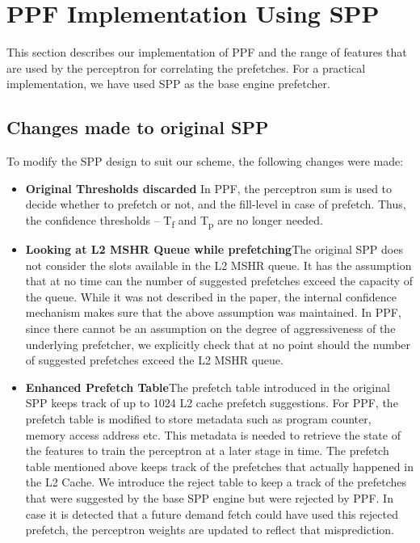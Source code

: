 \section{PPF Implementation Using SPP}
\label{Impl}

This section describes our implementation of PPF and the range of 
features that are used by the perceptron for correlating 
the prefetches.  For a practical implementation, we have used SPP 
as the base engine prefetcher.

\subsection{Changes made to original SPP}
\label{Impl-Changes}
To modify the SPP design to suit our scheme, the following changes were made:

\begin{itemize}
\item \textbf{Original Thresholds discarded}\newline 
  In PPF, the perceptron sum is used to decide whether to prefetch or not, 
  and the fill-level in case of prefetch. 
  Thus, the confidence thresholds --  T\textsubscript{f} and T\textsubscript{p} 
  are no longer needed.


\item \textbf{Looking at L2 MSHR Queue while prefetching}\newline The original
  SPP does not consider the slots available in the L2 MSHR queue.  It has the
  assumption that at no time can the number of suggested prefetches
  exceed the capacity of the queue.  While it was not described in the paper, the
  internal confidence mechanism makes sure that the above assumption was maintained.  
  In PPF, since there cannot be an assumption on the degree of aggressiveness of the 
  underlying prefetcher, we explicitly check that at no point should the number 
  of suggested prefetches exceed the L2 MSHR queue.

\item \textbf{Enhanced Prefetch Table}\newline The prefetch table introduced in the 
  original SPP keeps track of up to 1024 L2 cache prefetch suggestions.  
  For PPF, the prefetch table is modified to store metadata such as program counter, 
  memory access address etc.  This metadata is needed to retrieve the state  %
  of the features to train the perceptron at a later stage in time. The prefetch table 
  mentioned above keeps track of the prefetches that actually happened in the L2 Cache.
  We introduce the reject table to keep a track of the
  prefetches that were suggested by the base SPP engine but were rejected by PPF.  
  In case it is detected that a future demand fetch could have used
  this rejected prefetch, the perceptron weights are updated to reflect that
  misprediction.

\end{itemize}


